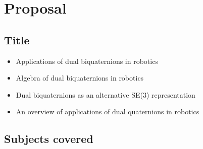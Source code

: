 \chapter{Proposal}

\section{Title}
\begin{itemize}
        \item Applications of dual biquaternions in robotics
        \item Algebra of dual biquaternions in robotics
        \item Dual biquaternions as an alternative SE(3) representation
        \item An overview of applications of dual quaternions in robotics
\end{itemize}


\section{Subjects covered}

